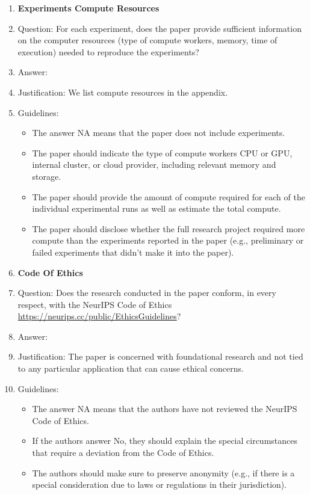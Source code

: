 \documentclass{article}
\theoremstyle{plain}
\theoremstyle{definition}
\theoremstyle{remark}
\theoremstyle{plain}
\begin{document}
\begin{enumerate}
\item {\bf Experiments Compute Resources}
    \item[] Question: For each experiment, does the paper provide sufficient information on the computer resources (type of compute workers, memory, time of execution) needed to reproduce the experiments?
    \item[] Answer: \answerYes{} %
    \item[] Justification: We list compute resources in the appendix.
    \item[] Guidelines:
    \begin{itemize}
        \item The answer NA means that the paper does not include experiments.
        \item The paper should indicate the type of compute workers CPU or GPU, internal cluster, or cloud provider, including relevant memory and storage.
        \item The paper should provide the amount of compute required for each of the individual experimental runs as well as estimate the total compute. 
        \item The paper should disclose whether the full research project required more compute than the experiments reported in the paper (e.g., preliminary or failed experiments that didn't make it into the paper). 
    \end{itemize}
    
\item {\bf Code Of Ethics}
    \item[] Question: Does the research conducted in the paper conform, in every respect, with the NeurIPS Code of Ethics \url{https://neurips.cc/public/EthicsGuidelines}?
    \item[] Answer: \answerYes{} %
    \item[] Justification: The paper is concerned with foundational research and not tied to any particular application that can cause ethical concerns.
    \item[] Guidelines:
    \begin{itemize}
        \item The answer NA means that the authors have not reviewed the NeurIPS Code of Ethics.
        \item If the authors answer No, they should explain the special circumstances that require a deviation from the Code of Ethics.
        \item The authors should make sure to preserve anonymity (e.g., if there is a special consideration due to laws or regulations in their jurisdiction).
    \end{itemize}



\end{enumerate}
\end{document}
